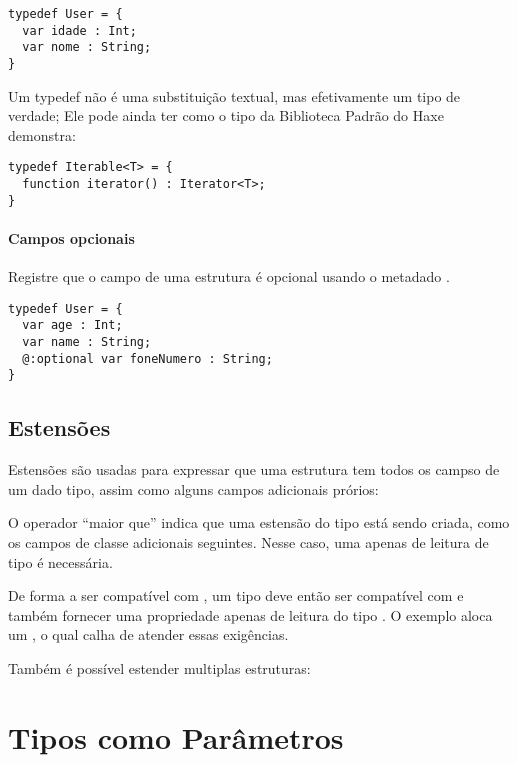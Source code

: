 \begin{lstlisting}
typedef User = {
  var idade : Int;
  var nome : String;
}
\end{lstlisting}
Um typedef não é uma substituição textual, mas efetivamente um tipo de verdade; Ele pode ainda ter  como o tipo  da Biblioteca Padrão do Haxe demonstra:

\begin{lstlisting}
typedef Iterable<T> = {
  function iterator() : Iterator<T>;
}
\end{lstlisting}

\paragraph{Campos opcionais}
Registre que o campo de uma estrutura é opcional usando o metadado .
\begin{lstlisting}
typedef User = {
  var age : Int;
  var name : String;
  @:optional var foneNumero : String;
}
\end{lstlisting}

\subsection{Estensões}
\label{type-system-extensions}

Estensões são usadas para expressar que uma estrutura tem todos os campso de um dado tipo, assim como alguns campos adicionais prórios:

O operador ``maior que'' \expr{>} indica que uma estensão do tipo  está sendo criada, como os campos de classe adicionais seguintes. Nesse caso, uma  apenas de leitura   de tipo  é necessária.

De forma a ser compatível com , um tipo deve então ser compatível com  e também fornecer uma propriedade  apenas de leitura do tipo . O exemplo aloca um  , o qual calha de atender essas exigências.


Também é possível estender multiplas estruturas:




\section{Tipos como Parâmetros}
\label{type-system-type-parameters}


